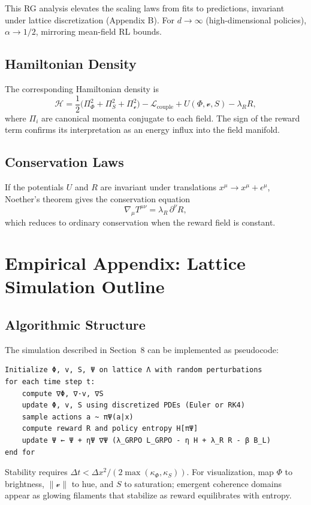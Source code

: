 \documentclass[11pt]{article}
\begin{document}
This RG analysis elevates the scaling laws from fits to predictions, invariant under lattice discretization (Appendix B). For $d \to \infty$ (high-dimensional policies), $\alpha \to 1/2$, mirroring mean-field RL bounds.

\subsection{Hamiltonian Density}

The corresponding Hamiltonian density is
\[
\mathcal{H} 
= \frac{1}{2}\big(\Pi_\Phi^2 + \Pi_S^2 + \Pi_{\mathcal{v}}^2\big)
- \mathcal{L}_{\mathrm{couple}}
+ U(\Phi,\mathcal{v},S)
- \lambda_R R,
\]
where $\Pi_i$ are canonical momenta conjugate to each field.  
The sign of the reward term confirms its interpretation as an energy influx into the field manifold.

\subsection{Conservation Laws}

If the potentials $U$ and $R$ are invariant under translations $x^\mu \rightarrow x^\mu+\epsilon^\mu$, Noether’s theorem gives the conservation equation
\[
\nabla_\mu T^{\mu\nu} = \lambda_R\,\partial^\nu R,
\]
which reduces to ordinary conservation when the reward field is constant.

\renewcommand{\thesection}{B}
\section{Empirical Appendix: Lattice Simulation Outline}

\subsection{Algorithmic Structure}

The simulation described in Section~8 can be implemented as pseudocode:

\begin{verbatim}
Initialize Φ, v, S, Ψ on lattice Λ with random perturbations
for each time step t:
    compute ∇Φ, ∇·v, ∇S
    update Φ, v, S using discretized PDEs (Euler or RK4)
    sample actions a ~ πΨ(a|x)
    compute reward R and policy entropy H[πΨ]
    update Ψ ← Ψ + ηΨ ∇Ψ (λ_GRPO L_GRPO - η H + λ_R R - β B_L)
end for
\end{verbatim}

Stability requires $\Delta t < \Delta x^2 / (2\max(\kappa_\Phi,\kappa_S))$.  
For visualization, map $\Phi$ to brightness, $\|\mathcal{v}\|$ to hue, and $S$ to saturation; emergent coherence domains appear as glowing filaments that stabilize as reward equilibrates with entropy.
\end{document}
